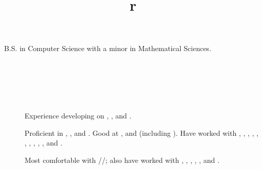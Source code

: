 \begin{resume}


\section{}

B.S. in Computer Science with a minor in Mathematical Sciences.


\begin{formatb}
  \title{r}\\
  \\
  \body\\
\end{formatb}


\section{}
\begin{description}
\item[]
Experience developing on , ,  and .
\item[]
Proficient in , ,  and \kw{\Cplusplus}.
Good at ,  and  (including
).
Have worked with \kw{\LaTeX}, , ,
\kw{\CSharp}, , , , , ,
,  and .

\item[]
Most comfortable with //;
also have worked with , , ,
, ,  and .

\end{description}

\section{}


\end{resume}

